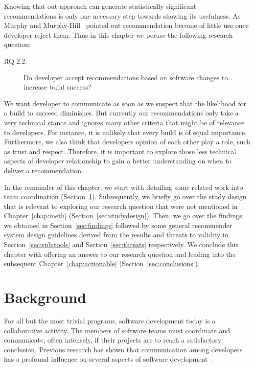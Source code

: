 \label{chap:talk}
Knowing that out approach can generate statistically significant recommendations is only one necessary step towards showing its usefulness.
As Murphy and Murphy-Hill~\cite{murphy:rsse:2010} pointed out recommendation become of little use once developer reject them.
Thus in this chapter we peruse the following research question:

\begin{description}
  \item[RQ 2.2:] Do developer accept recommendations based on software changes to increase build success? 
\end{description}

We want developer to communicate as soon as we suspect that the likelihood for a build to succeed diminishes.
But currently our recommendations only take a very technical stance and ignores many other criteria that might be of relevance to developers.
For instance, it is unlikely that every build is of equal importance.
Furthermore, we also think that developers opinion of each other play a role, such as trust and respect.
Therefore, it is important to explore those less technical aspects of developer relationship to gain a better understanding on when to deliver a recommendation.

In the remainder of this chapter, we start with detailing some related work into team coordination (Section~\ref{ch9:bg}).
Subsequently, we briefly go over the study design that is relevant to exploring our research question that were not mentioned in Chapter~\ref{chap:meth} (Section~\ref{sec:studydesign}).
Then, we go over the findings we obtained in Section~\ref{sec:findings} followed by some general recommender system design guidelines derived from the results and threats to validity in Section~\ref{sec:sub:tools} and Section~\ref{sec:threats} respectively.
We conclude this chapter with offering an answer to our research question and leading into the subsequent Chapter~\ref{chap:actionable} (Section~\ref{sec:conclusions}).

\section{Background}
\label{ch9:bg}
For all but the most trivial programs, software development today is a collaborative activity. The members of software teams must coordinate and communicate, often intensely, if their projects are to reach a satisfactory conclusion.
Previous research has shown that communication among developers has a profound influence on several aspects of software development~\cite{hinds:cscw:2006,wolf:icse:2009}.

